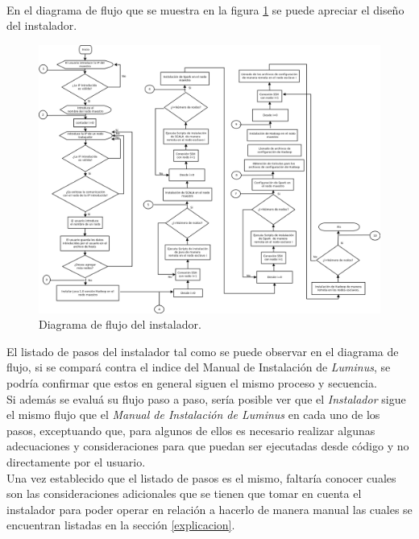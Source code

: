 \\
En el diagrama de flujo que se muestra en la figura \ref{fig:diagramaFlujo} se puede apreciar el diseño del instalador.
\begin{figure}[!htbp]
	\hypertarget{fig:diagramaFlujo}{\hspace{1pt}}
	\begin{center}
		\includegraphics[width=1\textwidth]{capitulo5/images/diagramaflujoinstalador.png}
		\caption{Diagrama de flujo del instalador.}
		\label{fig:diagramaFlujo}
	\end{center}
\end{figure}
\newpage
El listado de pasos del instalador tal como se puede observar en el diagrama de flujo, si se compará contra el indice del Manual de Instalación de \emph{Luminus}, se podría confirmar que estos en general siguen el mismo proceso y secuencia.
\\
Si además se evaluá su flujo paso a paso, sería posible ver que el \emph{Instalador} sigue el mismo flujo que el \emph{Manual de Instalación de Luminus} en cada uno de los pasos, exceptuando que, para algunos de ellos es necesario realizar algunas adecuaciones y consideraciones para que puedan ser ejecutadas desde código y no directamente por el usuario.
\\
Una vez establecido que el listado de pasos es el mismo,  faltaría conocer cuales son las consideraciones adicionales que se tienen que tomar en cuenta el instalador para poder operar en relación a hacerlo de manera manual las cuales se encuentran listadas en la sección \ref{explicacion}.
\\
